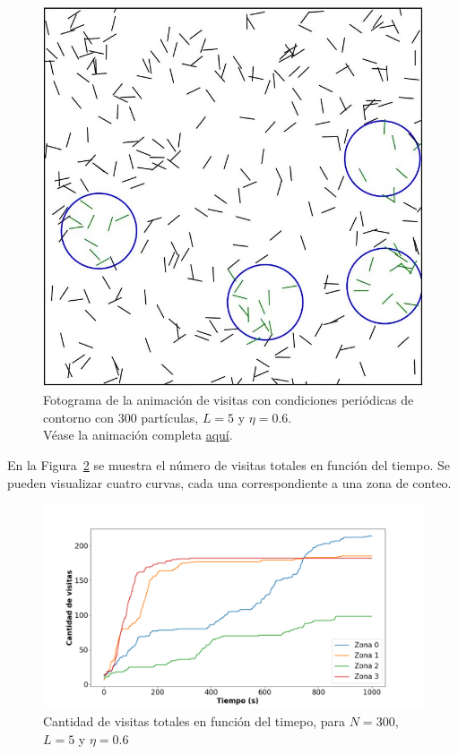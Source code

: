 \documentclass[11pt, a4paper]{article}
\begin{document}
            \begin{figure}[H]
                \centering
                \includegraphics[width=\textwidth]{./animation_visits_pbc-n300-eta0p6-frame}
                \caption{Fotograma de la animación de visitas con condiciones periódicas de contorno con $300$ partículas, $L = 5$ y $\eta = 0.6$.\\Véase la animación completa \href{https://youtu.be/MGHMlVLz0Ys}{aquí}.}
                \label{fig:visitas_pbc_1}
            \end{figure}

            En la Figura~\ref{fig:visitas_pbc_2} se muestra el número de visitas totales en función del tiempo.
            Se pueden visualizar cuatro curvas, cada una correspondiente a una zona de conteo.

            \begin{figure}[H]
                \centering
                \includegraphics[width=\textwidth]{./visits_vs_time_pbc-n300-eta0p6}
                \caption{Cantidad de visitas totales en función del timepo, para $N = 300$, $L = 5$ y $\eta = 0.6$}
                \label{fig:visitas_pbc_2}
            \end{figure}
\end{document}
